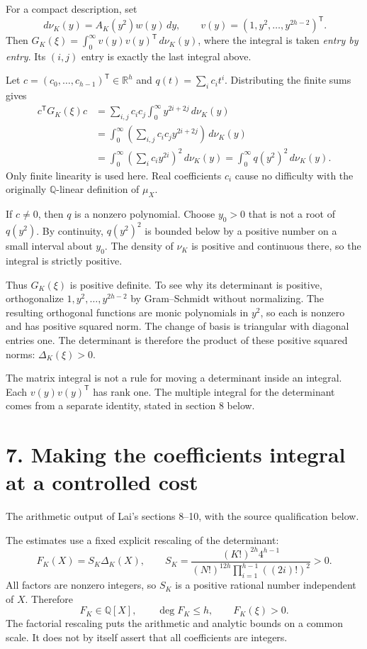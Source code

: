 \documentclass[11pt]{article}
\newcommand{\Q}{\mathbb Q}
\newcommand{\R}{\mathbb R}
\newcommand{\dd}{\,d}
\newcommand{\source}[1]{{\small\color{blue!45!black}#1}\par}
\newcommand{\heading}[2]{\section*{#1}\source{#2}}
\begin{document}
For a compact description, set
\[
 \dd\nu_K(y)=A_K(y^2)w(y)\dd y,\qquad
 v(y)=(1,y^2,\ldots,y^{2h-2})^{\mathsf T}.
\]
Then $G_K(\xi)=\int_0^\infty v(y)v(y)^{\mathsf T}\dd\nu_K(y)$,
where the integral is taken \emph{entry by entry}. Its $(i,j)$ entry is
exactly the last integral above.

Let $c=(c_0,\ldots,c_{h-1})^{\mathsf T}\in\R^h$ and
$q(t)=\sum_i c_it^i$. Distributing the finite sums gives
\begin{align*}
 c^{\mathsf T}G_K(\xi)c
 &=\sum_{i,j}c_ic_j\int_0^\infty y^{2i+2j}\dd\nu_K(y)\\
 &=\int_0^\infty\left(\sum_{i,j}c_ic_jy^{2i+2j}\right)\dd\nu_K(y)\\
 &=\int_0^\infty\left(\sum_i c_iy^{2i}\right)^2\dd\nu_K(y)
 =\int_0^\infty q(y^2)^2\dd\nu_K(y).
\end{align*}
Only finite linearity is used here. Real coefficients $c_i$ cause no
difficulty with the originally $\Q$-linear definition of $\mu_X$.

If $c\ne0$, then $q$ is a nonzero polynomial. Choose $y_0>0$ that is not
a root of $q(y^2)$. By continuity, $q(y^2)^2$ is bounded below by a positive
number on a small interval about $y_0$. The density of $\nu_K$ is positive
and continuous there, so the integral is strictly positive.

Thus $G_K(\xi)$ is positive definite. To see why its determinant is positive,
orthogonalize $1,y^2,\ldots,y^{2h-2}$ by Gram--Schmidt without normalizing.
The resulting orthogonal functions are monic polynomials in $y^2$, so each
is nonzero and has positive squared norm. The change of basis is triangular
with diagonal entries one. The determinant is therefore the product of
these positive squared norms: $\Delta_K(\xi)>0$.

The matrix integral is not a rule for moving a determinant inside an
integral. Each $v(y)v(y)^{\mathsf T}$ has rank one. The multiple integral
for the determinant comes from a separate identity, stated in section 8 below.

\newpage
\heading{7. Making the coefficients integral at a controlled cost}
{The arithmetic output of Lai's sections 8--10, with the source qualification below.}
The estimates use a fixed explicit rescaling of the determinant:
\[
 F_K(X)=S_K\Delta_K(X),\qquad
 S_K=\frac{(K!)^{2h}4^{h-1}}
 {(N!)^{12h}\displaystyle\prod_{i=1}^{h-1}((2i)!)^2}>0.
\]
All factors are nonzero integers, so $S_K$ is a positive rational number
independent of $X$. Therefore
\[
 F_K\in\Q[X],\qquad \deg F_K\leq h,\qquad F_K(\xi)>0.
\]
The factorial rescaling puts the arithmetic and analytic bounds on a common
scale. It does not by itself assert that all coefficients are integers.
\end{document}
